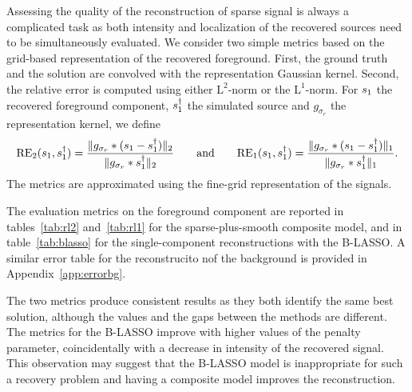 \documentclass[12pt]{article}
\begin{document}
        Assessing the quality of the reconstruction of sparse signal is always a complicated task as both intensity and localization of the recovered sources need to be simultaneously evaluated. We consider two simple metrics based on the grid-based representation of the recovered foreground. First, the ground truth and the solution are convolved with the representation Gaussian kernel. Second, the relative error is computed using either $\mathrm{L}^2$-norm or the $\mathrm{L}^1$-norm. For $s_1$ the recovered foreground component, $s_1^\dagger$ the simulated source and $g_{\sigma_r}$ the representation kernel, we define
        $$
        \mathrm{RE}_2(s_1, s_1^\dagger) = \frac{\lVert g_{\sigma_r} * (s_1 - s_1^\dagger) \rVert_2 }{ \lVert g_{\sigma_r} * s_1^\dagger \rVert_2} \qquad\text{and}\qquad
        \mathrm{RE}_1(s_1, s_1^\dagger) = \frac{\lVert g_{\sigma_r} * (s_1 - s_1^\dagger) \rVert_1}{\lVert g_{\sigma_r} *s_1^\dagger \rVert_1}.
        $$
        The metrics are approximated using the fine-grid representation of the signals.

        The evaluation metrics on the foreground component are reported in tables~\ref{tab:rl2} and~\ref{tab:rl1} for the sparse-plus-smooth composite model, and in table~\ref{tab:blasso} for the single-component reconstructions with the B-LASSO. A similar error table for the reconstrucito nof the background is provided in Appendix~\ref{app:errorbg}.

        The two metrics produce consistent results as they both identify the same best solution, although the values and the gaps between the methods are different. The metrics for the B-LASSO improve with higher values of the penalty parameter, coincidentally with a decrease in intensity of the recovered signal. This observation may suggest that the B-LASSO model is inappropriate for such a recovery problem and having a composite model improves the reconstruction. 
        
\end{document}
